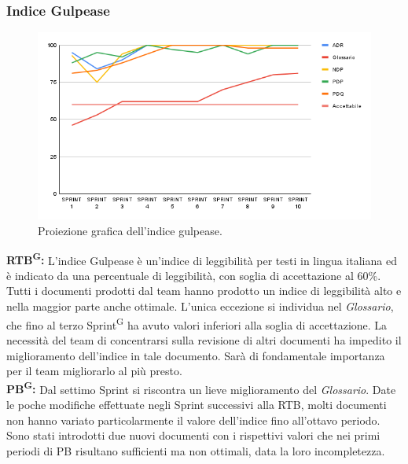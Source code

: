 \documentclass[8pt]{article}
\newcommand{\glossterm}[1]{#1\textsuperscript{G}} %
\begin{document}
\subsubsection{Indice Gulpease}
\begin{figure}[h!]
    \centering
    \includegraphics[width=1\textwidth]{images_pdq/IG.png}
    \caption{Proiezione grafica dell'indice gulpease.}
    \label{fig:Proiezione grafica dell'indice gulpease}
\end{figure}
\textbf{\glossterm{RTB}:} L'indice Gulpease è un'indice di leggibilità per testi in lingua italiana ed è indicato da una percentuale di leggibilità, con soglia di accettazione al 60\%. Tutti i documenti prodotti dal team hanno prodotto un indice di leggibilità alto e nella maggior parte anche ottimale. L'unica eccezione si individua nel \textit{Glossario}, che fino al terzo \glossterm{Sprint} ha avuto valori inferiori alla soglia di accettazione. La necessità del team di concentrarsi sulla revisione di altri documenti ha impedito il miglioramento dell'indice in tale documento. Sarà di fondamentale importanza per il team migliorarlo al più presto.\\
\textbf{\glossterm{PB}:} Dal settimo Sprint si riscontra un lieve miglioramento del \textit{Glossario}. Date le poche modifiche effettuate negli Sprint successivi alla RTB, molti documenti non hanno variato particolarmente il valore dell'indice fino all'ottavo periodo. Sono stati introdotti due nuovi documenti con i rispettivi valori che nei primi periodi di PB risultano sufficienti ma non ottimali, data la loro incompletezza.
\clearpage
\end{document}
